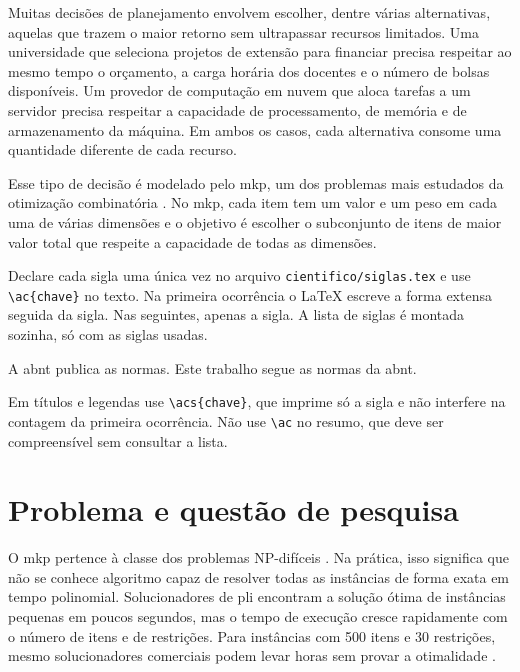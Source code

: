 Muitas decisões de planejamento envolvem escolher, dentre várias alternativas,
aquelas que trazem o maior retorno sem ultrapassar recursos limitados. Uma
universidade que seleciona projetos de extensão para financiar precisa
respeitar ao mesmo tempo o orçamento, a carga horária dos docentes e o número
de bolsas disponíveis. Um provedor de computação em nuvem que aloca tarefas a
um servidor precisa respeitar a capacidade de processamento, de memória e de
armazenamento da máquina. Em ambos os casos, cada alternativa consome uma
quantidade diferente de cada recurso.

Esse tipo de decisão é modelado pelo \ac{mkp}, um dos problemas mais estudados
da otimização combinatória \cite{freville2004multidimensional,
puchinger2010multidimensional}. No \acs{mkp}, cada item tem um valor e um peso
em cada uma de várias dimensões e o objetivo é escolher o subconjunto de itens
de maior valor total que respeite a capacidade de todas as dimensões.

\begin{instrucao}
Declare cada sigla uma única vez no arquivo \verb|cientifico/siglas.tex| e use
\verb|\ac{chave}| no texto. Na primeira ocorrência o LaTeX escreve a forma
extensa seguida da sigla. Nas seguintes, apenas a sigla. A lista de siglas é
montada sozinha, só com as siglas usadas.
\begin{exemplo}
A \ac{abnt} publica as normas.
Este trabalho segue as
normas da \ac{abnt}.
\end{exemplo}
Em títulos e legendas use \verb|\acs{chave}|, que imprime só a sigla e não
interfere na contagem da primeira ocorrência. Não use \verb|\ac| no resumo, que
deve ser compreensível sem consultar a lista.
\end{instrucao}

\section{Problema e questão de pesquisa}
\label{sec:introducao:problema}

O \acs{mkp} pertence à classe dos problemas NP-difíceis \cite{kellerer2004knapsack}.
Na prática, isso significa que não se conhece algoritmo capaz de resolver todas
as instâncias de forma exata em tempo polinomial. Solucionadores de \ac{pli}
encontram a solução ótima de instâncias pequenas em poucos segundos, mas o
tempo de execução cresce rapidamente com o número de itens e de restrições.
Para instâncias com 500 itens e 30 restrições, mesmo solucionadores comerciais
podem levar horas sem provar a otimalidade \cite{puchinger2010multidimensional}.


